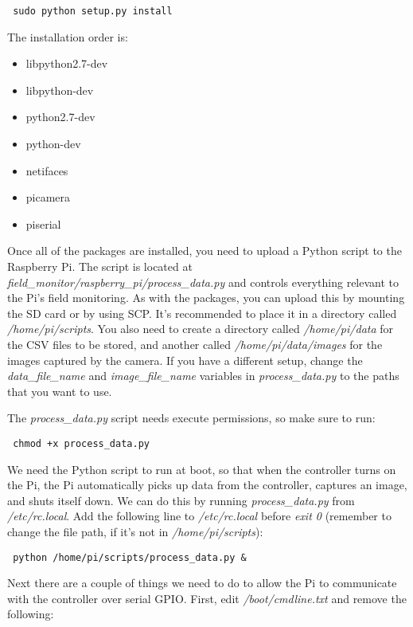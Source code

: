 \documentclass[10pt]{article}
\begin{document}
\begin{verbatim}
 sudo python setup.py install
\end{verbatim}

The installation order is:

\begin{itemize}
 \item libpython2.7-dev
 \item libpython-dev 
 \item python2.7-dev 
 \item python-dev 
 \item netifaces
 \item picamera
 \item piserial
\end{itemize}

Once all of the packages are installed, you need to upload a Python script to the Raspberry Pi. The script is located at
\textit{field\_monitor/raspberry\_pi/process\_data.py} and controls everything relevant to the Pi's field monitoring. As with the packages, you can upload this by
mounting the SD card or by using SCP. It's recommended to place it in a directory called \textit{/home/pi/scripts}. You also need to create a directory called
\textit{/home/pi/data} for the CSV files to be stored, and another called \textit{/home/pi/data/images} for the images captured by the camera. If you have a different
setup, change the \textit{data\_file\_name} and \textit{image\_file\_name} variables in \textit{process\_data.py} to the paths that you want to use.

The \textit{process\_data.py} script needs execute permissions, so make sure to run:

\begin{verbatim}
 chmod +x process_data.py
\end{verbatim}

We need the Python script to run at boot, so that when the controller turns on the Pi, the Pi automatically picks up data from the controller, captures an
image, and shuts itself down. We can do this by running \textit{process\_data.py} from \textit{/etc/rc.local}. Add the following line to \textit{/etc/rc.local} before
\textit{exit 0} (remember to change the file path, if it's not in \textit{/home/pi/scripts}):

\begin{verbatim}
 python /home/pi/scripts/process_data.py &
\end{verbatim}

Next there are a couple of things we need to do to allow the Pi to communicate with the controller over serial GPIO. First, edit \textit{/boot/cmdline.txt} and remove
the following:
\end{document}
